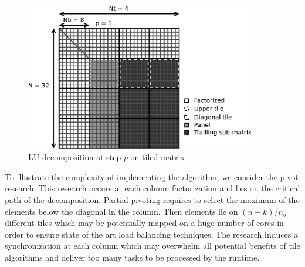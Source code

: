\begin{figure}[!ht]
\centering
\includegraphics[width=0.9\textwidth]{figures/tiled_matrix.pdf}
\caption{LU decomposition at step $p$ on tiled matrix \label{fig:tiled_matrix}}
\end{figure}

To illustrate the complexity of implementing the algorithm, we consider the pivot research. This research occurs at each column factorization and lies on the critical path of the decomposition. Partial pivoting requires to select the maximum of the elements below the diagonal in the column. Then elements lie on $(n-k)/n_b$ different tiles which may be potentially mapped on a huge number of cores in order to ensure state of the art load balancing techniques. The research induces a synchronization at each column which may overwhelm all potential benefits of tile algorithms and deliver too many tasks to be processed by the runtime.

